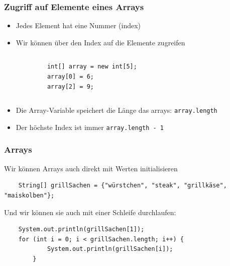 \documentclass{../../presentation}
\begin{document}
\begin{frame}[fragile]
    \frametitle{Zugriff auf Elemente eines Arrays}
    \begin{itemize}
        \item Jedes Element hat eine Nummer (index)
        \item Wir können über den Index auf die Elemente zugreifen
    \end{itemize}
    \begin{columns}
        \begin{verbatim}
            int[] array = new int[5];
            array[0] = 6;
            array[2] = 9;
        \end{verbatim}

        \begin{center}
        \end{center}
    \end{columns}

    \vspace{0.5cm}

    \begin{itemize}
        \item Die Array-Variable speichert die Länge das arrays: \texttt{array.length}
        \item Der höchste Index ist immer \texttt{array.length - 1}
    \end{itemize}
\end{frame}

\begin{frame}[fragile]
    \frametitle{Arrays}
    Wir können Arrays auch direkt mit Werten initialisieren
    \begin{verbatim}
    String[] grillSachen = {"würstchen", "steak", "grillkäse", "maiskolben"};
    \end{verbatim}
    Und wir können sie auch mit einer Schleife durchlaufen:
    \begin{verbatim}
    System.out.println(grillSachen[1]);
    for (int i = 0; i < grillSachen.length; i++) {
            System.out.println(grillSachen[i]);
        }
    \end{verbatim}
\end{frame}
\end{document}
